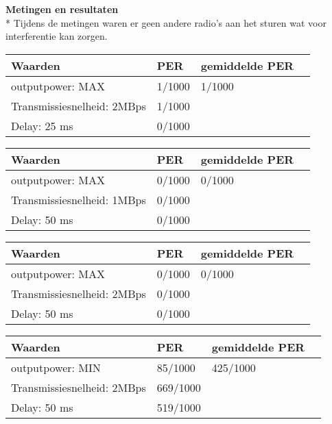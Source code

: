 \documentclass{article}
\begin{document}
\textbf {Metingen en resultaten}  \\*
Tijdens de metingen waren er geen andere radio's aan het sturen wat voor interferentie kan zorgen.
\begin{center}
    \begin{tabular}{ | l | l | l | p{5cm} |}
    \hline
    Waarden & PER & gemiddelde PER\\ \hline
    outputpower: MAX & 1/1000 & 1/1000\\ \hline
    Transmissiesnelheid: 2MBps & 1/1000 &  \\ \hline
    Delay: 25 ms & 0/1000&  \\
    \hline
    \end{tabular}
\end{center} 
\begin{center}
    \begin{tabular}{ | l | l | l | p{5cm} |}
    \hline
    Waarden & PER & gemiddelde PER\\ \hline
    outputpower: MAX & 0/1000 & 0/1000\\ \hline
    Transmissiesnelheid: 1MBps & 0/1000 &  \\ \hline
    Delay: 50 ms & 0/1000 &   \\
    \hline
    \end{tabular}
\end{center} 
\begin{center}
    \begin{tabular}{ | l | l | l | p{5cm} |}
    \hline
    Waarden & PER & gemiddelde PER\\ \hline
    outputpower: MAX & 0/1000 & 0/1000\\ \hline
    Transmissiesnelheid: 2MBps & 0/1000 &  \\ \hline
    Delay: 50 ms & 0/1000&  \\
    \hline
    \end{tabular}
\end{center} 
\begin{center}
    \begin{tabular}{ | l | l | l | p{5cm} |}
    \hline
    Waarden & PER & gemiddelde PER\\ \hline
    outputpower: MIN & 85/1000 & 425/1000\\ \hline
    Transmissiesnelheid: 2MBps & 669/1000  &  \\ \hline
    Delay: 50 ms & 519/1000 &  \\
    \hline
    \end{tabular}
\end{center} 
\end{document}
